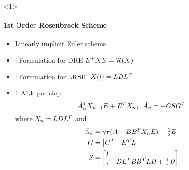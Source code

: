 \begin{frame}<1>{\subsecname}
\framesubtitle{1st Order Rosenbrock Scheme}
\begin{bigpicturecols}
  \begin{itemize}
    \item
      Linearly implicit Euler scheme
    \item
      \cite{Mena2007}: Formulation for DRE $E^T \dot X E = \operatorname{\mathcal R}(X)$
    \item
      \cite{Lang2017}: Formulation for LRSIF $X(t) = LDL^T$
    \item
      1 ALE per step:
      \begin{equation*}
        \tilde A_n^T X_{n+1} E + E^T X_{n+1} \tilde A_n = - GSG^T
      \end{equation*}
      where $X_n = LDL^T$ and
      \begin{align*}
        \tilde A_n &= \gamma\tau(A-BB^T X_n E) - \tfrac{1}{2} E
        \\
        G &= \begin{bmatrix}
          C^T & E^T L
        \end{bmatrix}
        \\
        S &= \begin{bmatrix}
          I & . \\
          . & DL^T BB^T LD + \tfrac{1}{\tau} D
        \end{bmatrix}
      \end{align*}
      \vspace{-\baselineskip}
  \end{itemize}
  \vfill
\column{\bigpicturewidth}
\end{bigpicturecols}
\end{frame}

